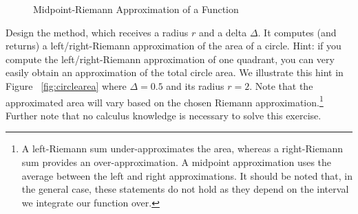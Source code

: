 \begin{figure}[H]
\begin{center}
\end{center}
\caption{Midpoint-Riemann Approximation of a Function}
\label{fig:riemannf}
\end{figure}

Design the  method, which receives a radius $r$ and a delta $\Delta$. It computes (and returns) a left/right-Riemann approximation of the area of a circle. Hint: if you compute the left/right-Riemann approximation of one quadrant, you can very easily obtain an approximation of the total circle area. We illustrate this hint in Figure ~\ref{fig:circlearea} where $\Delta=0.5$ and its radius $r=2$. Note that the approximated area will vary based on the chosen Riemann approximation.\footnote{A left-Riemann sum under-approximates the area, whereas a right-Riemann sum provides an over-approximation. A midpoint approximation uses the average between the left and right approximations. It should be noted that, in the general case, these statements do not hold as they depend on the interval we integrate our function over.} Further note that no calculus knowledge is necessary to solve this exercise.


